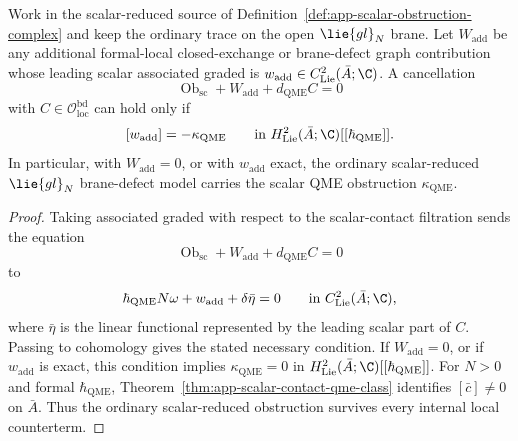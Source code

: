 \begin{thm}
\label{thm:app-ordinary-glN-scalar-obstruction-criterion}
  Work in the scalar-reduced source of
  Definition~\ref{def:app-scalar-obstruction-complex} and keep the
  ordinary trace on the open \(\lie{gl}_N\) brane.  Let
  \(W_{\mathrm{add}}\) be any additional formal-local closed-exchange or
  brane-defect graph contribution whose leading scalar associated
  graded is \(w_{\mathrm{add}}\in C^2_{\mathrm{Lie}}(\bar A;\C)\).  A
  cancellation
  \[
    \operatorname{Ob}_{\mathrm{sc}}
      +W_{\mathrm{add}}+d_{\mathrm{QME}}C=0
  \]
  with \(C\in\mathcal O_{\mathrm{loc}}^{\mathrm{bd}}\) can hold only if
  \[
    [w_{\mathrm{add}}]=-\kappa_{\mathrm{QME}}
      \qquad\text{in }
      H^2_{\mathrm{Lie}}(\bar A;\C)[[\hbar_{\mathrm{QME}}]].
  \]
  In particular, with \(W_{\mathrm{add}}=0\), or with
  \(w_{\mathrm{add}}\) exact, the ordinary scalar-reduced
  \(\lie{gl}_N\) brane-defect model carries the scalar QME obstruction
  \(\kappa_{\mathrm{QME}}\).
\end{thm}

\begin{proof}
  Taking associated graded with respect to the scalar-contact filtration
  sends the equation
  \[
    \operatorname{Ob}_{\mathrm{sc}}
      +W_{\mathrm{add}}+d_{\mathrm{QME}}C=0
  \]
  to
  \[
    \hbar_{\mathrm{QME}}N\omega+w_{\mathrm{add}}+\delta\bar\eta=0
      \qquad\text{in }C^2_{\mathrm{Lie}}(\bar A;\C),
  \]
  where \(\bar\eta\) is the linear functional represented by the
  leading scalar part of \(C\).  Passing to cohomology gives the stated
  necessary condition.  If \(W_{\mathrm{add}}=0\), or if
  \(w_{\mathrm{add}}\) is exact, this condition implies
  \(\kappa_{\mathrm{QME}}=0\) in
  \(H^2_{\mathrm{Lie}}(\bar A;\C)[[\hbar_{\mathrm{QME}}]]\).
  For \(N>0\) and formal \(\hbar_{\mathrm{QME}}\),
  Theorem~\ref{thm:app-scalar-contact-qme-class} identifies
  \([\bar c]\neq0\) on \(\bar A\).  Thus the ordinary scalar-reduced
  obstruction survives every internal local counterterm.
\end{proof}

